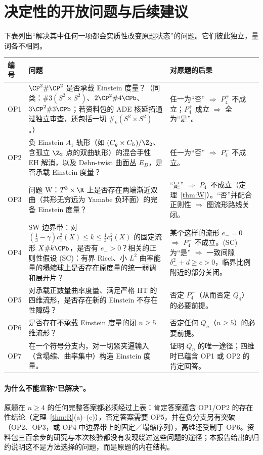 \section{决定性的开放问题与后续建议}\label{sec:open}

下表列出“解决其中任何一项都会实质性改变原题状态”的问题。它们彼此独立，量词各不相同。

\begin{longtable}{L{0.06\textwidth}L{0.50\textwidth}L{0.36\textwidth}}
\toprule 编号 & 问题 & 对原题的后果\\\midrule\endhead
OP1 & $\CP^2\#\CP^2$ 是否承载 Einstein 度量？（同类：$\#3(S^2\times S^2)$、$2\CP^2\#4\CPb$、$3\CP^2\#3\CPb$；若资料包的 ADE 核延拓通过独立审查，还包括一切 $\#_k(S^2\times S^2)$。）& 任一为“否” $\Rightarrow$ $P_4^+$ 不成立；$P_4^+$ 成立 $\Rightarrow$ 全为“是”。\\
OP2 & 负 Einstein $A_1$ 轨形（如 $(C_g\times C_h)/\Z_2$、含孤立 $\Z_2$ 点的双曲轨形）的混合手性 EH 解消，以及 Dehn-twist 曲面丛 $E_D$，是否承载 Einstein 度量？& 任一为“否” $\Rightarrow$ $P_4^-$ 不成立。\\
OP3 & 问题 W：$T^3\times\R$ 上是否存在两端渐近双曲（共形无穷远为 Yamabe 负环面）的完备 Einstein 度量？& “是” $\Rightarrow$ $P_4^-$ 不成立（定理~\ref{thm:W}）。“否”并配合正则性 $\Rightarrow$ 图流形路线关闭。\\
OP4 & SW 边界带：对 $(\frac13-\gamma)c_1^2(X)\le k\le\frac13c_1^2(X)$ 的固定流形 $X\#k\CPb$，是否有 $e_->0$？相关的正则性假设 (SC)：有界 Ricci、小 $L^2$ 曲率能量的塌缩球上是否存在原度量的统一弱调和展开片？& 某个这样的流形 $e_-=0$ $\Rightarrow$ $P_4^-$ 不成立。(SC) 为“是” $\Rightarrow$ 一致间隙 $\delta_-^2+d\ge c>0$，临界比例附近的部分关闭。\\
OP5 & 对承载正数量曲率度量、满足严格 HT 的四维流形，是否存在新的 Einstein 不存在性障碍？& 否定 $P_4^+$（从而否定 $Q_4$）的必要前提。\\
OP6 & 是否存在不承载 Einstein 度量的闭 $n\ge5$ 维流形？& 否定任何 $Q_n$（$n\ge5$）的必要前提。\\
OP7 & 在一个符号分支内，对一切紧夹逼输入（含塌缩、曲率集中）构造 Einstein 度量。& 证明 $Q_n$ 的唯一途径；四维时已蕴含 OP1 或 OP2 的肯定回答。\\
\bottomrule
\end{longtable}

\paragraph{为什么不能宣称“已解决”。}原题在 $n\ge4$ 的任何完整答案都必须经过上表：肯定答案蕴含 OP1/OP2 的存在性结论（定理~\ref{thm:R}(a)--(c)），否定答案需要 OP5，并在负分支另有突破（OP2、OP3，或 OP4 中边界带上的固定／塌缩序列），高维还受制于 OP6。资料包三百余步的研究与本次核验都没有发现绕过这些问题的途径；本报告给出的归约说明这不是方法选择的问题，而是原题的内在结构。

